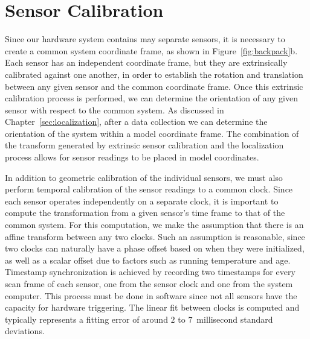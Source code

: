 \documentclass[12pt,onecolumn,oneside]{book}
\begin{document}
\section{Sensor Calibration}
\label{sec:calibration}

Since our hardware system contains may separate sensors, it is necessary to create a common system coordinate frame, as shown in Figure~\ref{fig:backpack}b.  Each sensor has an independent coordinate frame, but they are extrinsically calibrated against one another, in order to establish the rotation and translation between any given sensor and the common coordinate frame.  Once this extrinsic calibration process is performed, we can determine the orientation of any given sensor with respect to the common system.  As discussed in Chapter~\ref{sec:localization}, after a data collection we can determine the orientation of the system within a model coordinate frame.  The combination of the transform generated by extrinsic sensor calibration and the localization process allows for sensor readings to be placed in model coordinates.

In addition to geometric calibration of the individual sensors, we must also perform temporal calibration of the sensor readings to a common clock.  Since each sensor operates independently on a separate clock, it is important to compute the transformation from a given sensor's time frame to that of the common system.  For this computation, we make the assumption that there is an affine transform between any two clocks.  Such an assumption is reasonable, since two clocks can naturally have a phase offset based on when they were initialized, as well as a scalar offset due to factors such as running temperature and age.  Timestamp synchronization is achieved by recording two timestamps for every scan frame of each sensor, one from the sensor clock and one from the system computer.  This process must be done in software since not all sensors have the capacity for hardware triggering.  The linear fit between clocks is computed and typically represents a fitting error of around $2$ to $7$~millisecond standard deviations.

\end{document}
